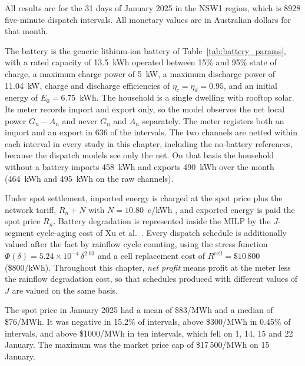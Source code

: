 All results are for the 31 days of January 2025 in the NSW1 region, which is 8928
five-minute dispatch intervals. All monetary values are in Australian dollars for that
month.

The battery is the generic lithium-ion battery of Table~\ref{tab:battery_params}, with a
rated capacity of 13.5~kWh operated between 15\% and 95\% state of charge, a
maximum charge power of 5~kW, a maximum discharge power of 11.04~kW, charge and
discharge efficiencies of $\eta_c = \eta_d = 0.95$, and an initial energy of
$E_0 = 6.75$~kWh. The household is a single dwelling with rooftop solar. Its meter
records import and export only, so the model observes the net local power
$G_n - A_n$ and never $G_n$ and $A_n$ separately. The meter registers both an import
and an export in 636 of the intervals. The two channels are netted within each
interval in every study in this chapter, including the no-battery references, because
the dispatch models see only the net. On that basis the household without a battery
imports 458~kWh and exports 490~kWh over the month (464~kWh and 495~kWh on the raw
channels).

Under spot settlement, imported energy is charged at the spot price plus the network
tariff, $R_n + N$ with $N = 10.80$~c/kWh \cite{ausgrid2024networkpricelist},
and exported energy is paid the spot price $R_n$. Battery degradation is represented
inside the MILP by the $J$-segment cycle-aging cost of Xu et al.~\cite{Xu2018}.
Every dispatch schedule is additionally valued after the fact by rainflow cycle counting,
using the stress function $\Phi(\delta) = 5.24\times10^{-4}\,\delta^{2.03}$ and a cell
replacement cost of $R^{\mathrm{cell}} = \$10\,800$ (\$800/kWh). Throughout this chapter, \emph{net
profit} means profit at the meter less the rainflow degradation cost, so that schedules
produced with different values of $J$ are valued on the same basis.

The spot price in January 2025 had a mean of \$83/MWh and a median of \$76/MWh. It was
negative in 15.2\% of intervals, above \$300/MWh in 0.45\% of intervals, and above
\$1000/MWh in ten intervals, which fell on 1, 14, 15 and 22 January. The maximum was the
market price cap of \$17\,500/MWh on 15 January.



